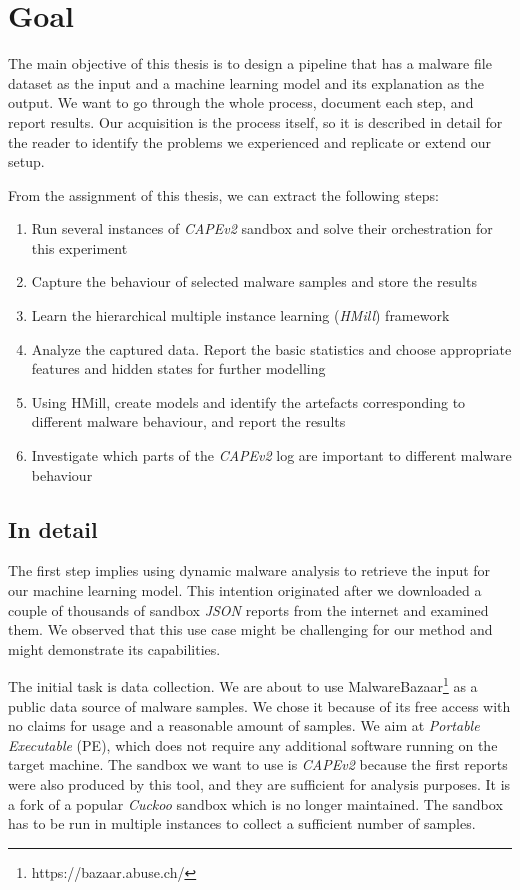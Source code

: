 \section*{Goal}
The main objective of this thesis is to design a pipeline that has a malware file dataset as the input and a machine learning model and its explanation as the output. We want to go through the whole process, document each step, and report results. Our acquisition is the process itself, so it is described in detail for the reader to identify the problems we experienced and replicate or extend our setup.

From the assignment of this thesis, we can extract the following steps:
\begin{enumerate}
    \itemsep0em 
    \item Run several instances of \emph{CAPEv2} \cite{Cape} sandbox and solve their orchestration for this experiment
    \item Capture the behaviour of selected malware samples and store the results
    \item Learn the hierarchical multiple instance learning (\emph{HMill}) framework
    \item Analyze the captured data. Report the basic statistics and choose appropriate features and hidden states for further modelling
    \item Using HMill, create models and identify the artefacts corresponding to different malware behaviour, and report the results
    \item Investigate which parts of the \emph{CAPEv2} log are important to different malware behaviour
\end{enumerate}
\subsection*{In detail}
The first step implies using dynamic malware analysis to retrieve the input for our machine learning model. This intention originated after we downloaded a couple of thousands of sandbox \emph{JSON} reports from the internet and examined them. We observed that this use case might be challenging for our method and might demonstrate its capabilities.

The initial task is data collection. We are about to use MalwareBazaar\footnote{https://bazaar.abuse.ch/} as a public data source of malware samples. We chose it because of its free access with no claims for usage and a reasonable amount of samples. We aim at \emph{Portable Executable} (PE), which does not require any additional software running on the target machine. The sandbox we want to use is \emph{CAPEv2} \cite{Cape} because the first reports were also produced by this tool, and they are sufficient for analysis purposes.  It is a fork of a popular \emph{Cuckoo} sandbox which is no longer maintained. The sandbox has to be run in multiple instances to collect a sufficient number of samples.

